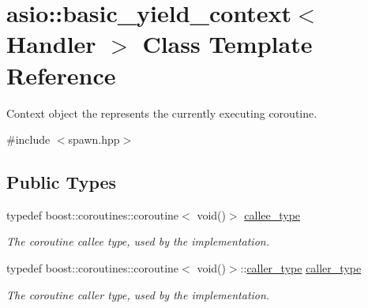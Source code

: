\hypertarget{classasio_1_1basic__yield__context}{}\section{asio\+:\+:basic\+\_\+yield\+\_\+context$<$ Handler $>$ Class Template Reference}
\label{classasio_1_1basic__yield__context}


Context object the represents the currently executing coroutine.  




{\ttfamily \#include $<$spawn.\+hpp$>$}

\subsection*{Public Types}
\begin{DoxyCompactItemize}
\item 
typedef boost\+::coroutines\+::coroutine$<$ void()$>$ \hyperlink{classasio_1_1basic__yield__context_afd9613f4a7188a89d349a3aa34b88220}{callee\+\_\+type}
\begin{DoxyCompactList}\small\item\em The coroutine callee type, used by the implementation. \end{DoxyCompactList}\item 
typedef boost\+::coroutines\+::coroutine$<$ void()$>$\+::\hyperlink{classasio_1_1basic__yield__context_a3f865e7e2e46345effce8163336f1c8e}{caller\+\_\+type} \hyperlink{classasio_1_1basic__yield__context_a3f865e7e2e46345effce8163336f1c8e}{caller\+\_\+type}
\begin{DoxyCompactList}\small\item\em The coroutine caller type, used by the implementation. \end{DoxyCompactList}\end{DoxyCompactItemize}
